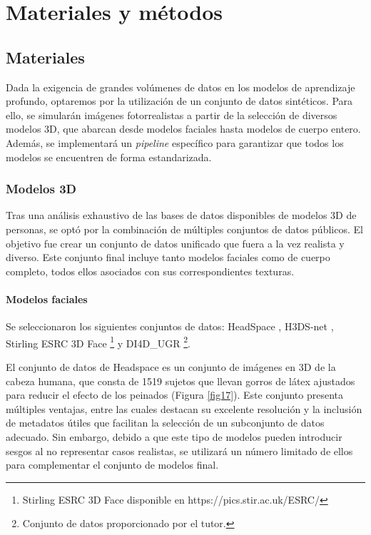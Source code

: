 \chapter{Materiales y métodos}
\thispagestyle{empty}

\section{Materiales}

Dada la exigencia de grandes volúmenes de datos en los modelos de aprendizaje profundo, optaremos por la utilización de un conjunto de datos sintéticos. Para ello, se simularán imágenes fotorrealistas a partir de la selección de diversos modelos 3D, que abarcan desde modelos faciales hasta modelos de cuerpo entero. Además, se implementará un \textit{pipeline} específico para garantizar que todos los modelos se encuentren de forma estandarizada.

\subsection{Modelos 3D}
Tras una análisis exhaustivo de las bases de datos disponibles de modelos 3D de personas, se optó por la combinación de múltiples conjuntos de datos públicos. El objetivo fue crear un conjunto de datos unificado que fuera a la vez realista y diverso. Este conjunto final incluye tanto modelos faciales como de cuerpo completo, todos ellos asociados con sus correspondientes texturas.

\subsubsection{Modelos faciales}
Se seleccionaron los siguientes conjuntos de datos: HeadSpace \cite{60}, H3DS-net \cite{61}, Stirling ESRC 3D Face \footnote{Stirling ESRC 3D Face disponible en https://pics.stir.ac.uk/ESRC/}  y DI4D\_UGR \footnote{Conjunto de datos proporcionado por el tutor.}.

El conjunto de datos de Headspace \cite{60} es un conjunto de imágenes en 3D de la cabeza humana, que consta de 1519 sujetos que llevan gorros de látex ajustados para reducir el efecto de los peinados (Figura \ref{fig17}). Este conjunto presenta múltiples ventajas, entre las cuales destacan su excelente resolución y la inclusión de metadatos útiles que facilitan la selección de un subconjunto de datos adecuado. Sin embargo, debido a que este tipo de modelos pueden introducir sesgos al no representar casos realistas, se utilizará un número limitado de ellos para complementar el conjunto de modelos final.

